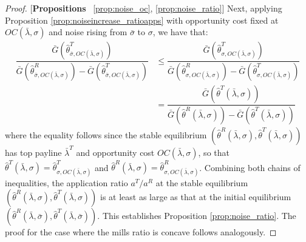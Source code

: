 \begin{proof}{[\textbf{Propositions} ~\ref{prop:noise_oc}, \ref{prop:noise_ratio}]}
\noindent Next, applying Proposition \ref{prop:noiseincrease_ratioapps} with opportunity cost fixed at $OC(\bar{\lambda},\sigma)$ and noise rising from $\bar{\sigma}$ to $\sigma$, we have that:
\begin{align*}
    \dfrac{\bar{G}(\hat{\theta}^T_{\bar{\sigma},OC(\bar{\lambda},\sigma)})}{\bar{G}(\hat{\theta}^R_{\bar{\sigma},OC(\bar{\lambda},\sigma)}) - \bar{G}(\hat{\theta}^T_{\bar{\sigma},OC(\bar{\lambda},\sigma)})} &\leq \dfrac{\bar{G}(\hat{\theta}^T_{\sigma,OC(\bar{\lambda},\sigma)})}{\bar{G}(\hat{\theta}^R_{\sigma,OC(\bar{\lambda},\sigma)}) - \bar{G}(\hat{\theta}^T_{\sigma,OC(\bar{\lambda},\sigma)})} \\
    &= \dfrac{\bar{G}(\hat{\theta}^T(\bar{\lambda},\sigma) )}{\bar{G}(\hat{\theta}^R(\bar{\lambda},\sigma) ) - \bar{G}(\hat{\theta}^T(\bar{\lambda},\sigma) )}
\end{align*}
where the equality follows since the stable equilibrium $(\hat{\theta}^R(\bar{\lambda},\sigma),\hat{\theta}^T(\bar{\lambda},\sigma))$ has top payline $\bar{\lambda}^T$ and opportunity cost $OC(\bar{\lambda},\sigma)$, so that $\hat{\theta}^T(\bar{\lambda},\sigma) = \hat{\theta}^T_{\sigma,OC(\bar{\lambda},\sigma)}$ and $\hat{\theta}^R(\bar{\lambda},\sigma) = \hat{\theta}^R_{\sigma,OC(\bar{\lambda},\sigma)}$. Combining both chains of inequalities, the application ratio $a^T/a^R$ at the stable equilibrium $(\hat{\theta}^R(\bar{\lambda},\sigma),\hat{\theta}^T(\bar{\lambda},\sigma))$ is at least as large as that at the initial equilibrium $(\hat{\theta}^R(\bar{\lambda},\bar{\sigma}),\hat{\theta}^T(\bar{\lambda},\bar{\sigma}))$. This establishes Proposition \ref{prop:noise_ratio}. The proof for the case where the mills ratio is concave follows analogously. 
\end{proof}


